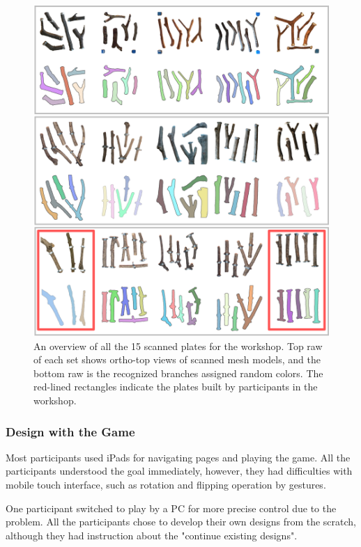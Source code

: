\begin{figure}[ht]
  \begin{center}
    \includegraphics[width = 0.4\paperwidth]{images/fabrication/all_plates.png}
    \caption{An overview of all the 15 scanned plates for the workshop. Top raw of each set shows ortho-top views of scanned mesh models, and the bottom raw is the recognized branches assigned random colors. The red-lined rectangles indicate the plates built by participants in the workshop.}
    \label{fig:scannedplates}
  \end{center}
\end{figure}


\subsubsection*{Design with the Game}
Most participants used iPads for navigating pages and playing the game.
All the participants understood the goal immediately, however, they had difficulties with mobile touch interface, such as rotation and flipping operation by gestures.

One participant switched to play by a PC for more precise control due to the problem.
All the participants chose to develop their own designs from the scratch, although they had instruction about the "continue existing designs".

